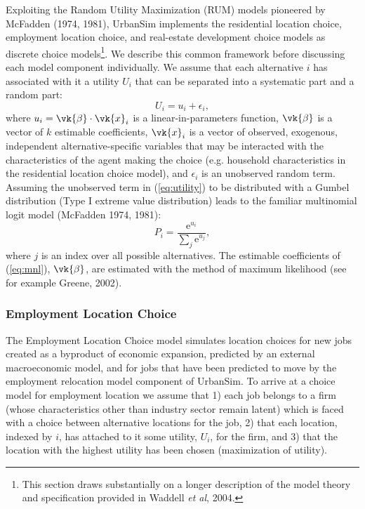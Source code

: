 Exploiting the Random Utility Maximization (RUM) models pioneered
by McFadden (1974, 1981), UrbanSim implements the residential
location choice, employment location choice, and real-estate
development choice models as discrete choice models\footnote{This
section draws substantially on a longer description of the model
theory and specification provided in Waddell \emph{et al}, 2004.}.
We describe this common framework before discussing each model
component individually. We assume that each alternative $i$ has
associated with it a utility $U_i$ that can be separated into a
systematic part and a random part:
\begin{equation}
    U_i = u_i + \epsilon_i,
    \label{eq:utility}
\end{equation}
where $u_i = \vk{\beta}\cdot\vk{x}_i$ is a linear-in-parameters
function, $\vk{\beta}$ is a vector of $k$ estimable coefficients,
$\vk{x}_i$ is a vector of observed, exogenous, independent
alternative-specific variables that may be interacted with the
characteristics of the agent making the choice (e.g. household
characteristics in the residential location choice model), and
$\epsilon_i$ is an unobserved random term. Assuming the unobserved
term in (\ref{eq:utility}) to be distributed with a Gumbel
distribution (Type I extreme value distribution) leads to the
familiar multinomial logit model (McFadden 1974, 1981):
\begin{equation}
    P_i = \frac{\mathrm{e}^{u_i}}{\sum_j \mathrm{e}^{u_j}},
    \label{eq:mnl}
\end{equation}
where $j$ is an index over all possible alternatives. The
estimable coefficients of (\ref{eq:mnl}), $\vk{\beta}$, are
estimated with the method of maximum likelihood (see for example
Greene, 2002).

\subsubsection{Employment Location Choice}

The Employment Location Choice model simulates location choices
for new jobs created as a byproduct of economic expansion,
predicted by an external macroeconomic model, and for jobs that
have been predicted to move by the employment relocation model
component of UrbanSim. To arrive at a choice model for employment
location we assume that 1) each job belongs to a firm (whose
characteristics other than industry sector remain latent) which is
faced with a choice between alternative locations for the job, 2)
that each location, indexed by $i$, has attached to it some
utility, $U_i$, for the firm, and 3) that the location with the
highest utility has been chosen (maximization of utility).

